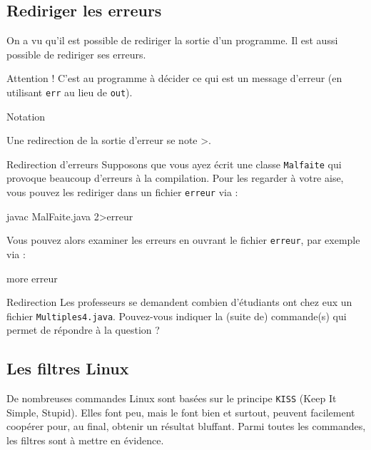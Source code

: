 \documentclass[a4paper,11pt]{article}
\begin{document}
	\subsection{Rediriger les erreurs}  
          	On a vu qu'il est possible de rediriger la sortie d'un programme.
		Il est aussi possible de rediriger ses erreurs.
				
          	Attention ! C'est au programme \`a d\'ecider ce qui est un message d'erreur (en utilisant
		\verb_err_ au lieu de \verb_out_).
			
		\begin{coltbox}{Notation}
		
					Une redirection de la sortie d'erreur se note >\guillemotright .
				
		\end{coltbox}
\newpage
			
		\begin{Exemple}{Redirection d'erreurs}
			Supposons que vous ayez \'ecrit une classe \verb_Malfaite_ qui provoque beaucoup d'erreurs \`a la compilation.
			Pour les regarder \`a votre aise, vous pouvez les rediriger dans un fichier 
					\verb_erreur_ via :
					\begin{Console}
						javac MalFaite.java 2>erreur
						
					\end{Console}
					Vous pouvez alors examiner les erreurs en ouvrant le fichier \verb_erreur_,
					par exemple via : 
					\begin{Console} 
						more erreur
					\end{Console}
					
		\end{Exemple}		
          	
		\begin{Exercice}{Redirection}        
			Les professeurs se demandent combien d'\'etudiants ont chez eux
			un fichier \verb_Multiples4.java_. Pouvez-vous indiquer la (suite de) commande(s)
			qui permet de r\'epondre \`a la question ?
		\end{Exercice}
				
            \par
        \subsection{Les filtres Linux}  
      		De nombreuses commandes Linux sont bas\'ees sur le principe \verb_KISS_ (Keep It Simple, Stupid).
		Elles font peu, mais le font bien et surtout, peuvent facilement coop\'erer pour, au final,
		obtenir un r\'esultat bluffant. Parmi toutes les commandes, les filtres sont \`a mettre en \'evidence.
		
\end{document}
